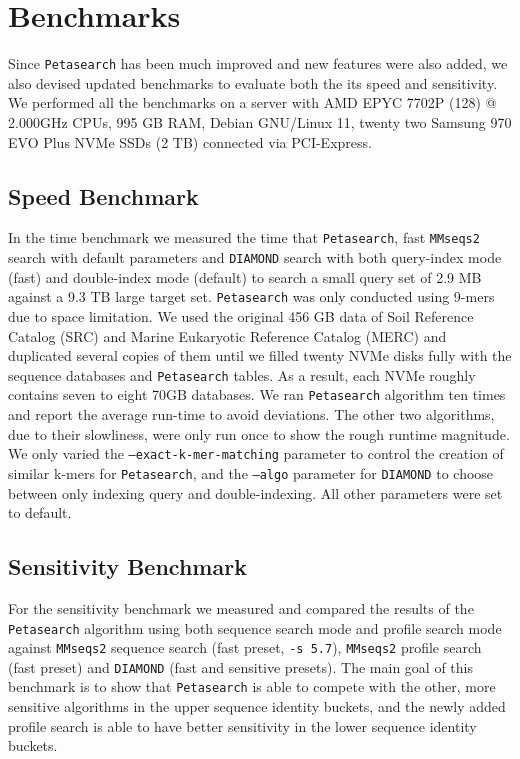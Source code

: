 \section{Benchmarks} \label{section:benchmarks}

Since \texttt{Petasearch} has been much improved and new features were also added, we also devised updated benchmarks to evaluate both the its speed and sensitivity.
We performed all the benchmarks on a server with AMD EPYC 7702P (128) @ 2.000GHz CPUs, 995 GB RAM, Debian GNU/Linux 11, twenty two Samsung 970 EVO Plus NVMe SSDs (2 TB) connected via PCI-Express.

\subsection{Speed Benchmark} \label{section:speed-benchmark}

In the time benchmark we measured the time that \texttt{Petasearch}, fast \texttt{MMseqs2} search with default parameters and \texttt{DIAMOND} search with both query-index mode (fast) and double-index mode (default) to search a small query set of 2.9 MB against a 9.3 TB large target set.
\texttt{Petasearch} was only conducted using 9-mers due to space limitation.
We used the original 456 GB data of Soil Reference Catalog (SRC) and Marine Eukaryotic Reference Catalog (MERC) \cite{steinegger_protein-level_2019} and duplicated several copies of them until we filled twenty NVMe disks fully with the sequence databases and \texttt{Petasearch} tables.
As a result, each NVMe roughly contains seven to eight 70GB databases.
We ran \texttt{Petasearch} algorithm ten times and
report the average run-time to avoid deviations.
The other two algorithms, due to their slowliness, were only run once to show the rough runtime magnitude.
We only varied the \texttt{--exact-k-mer-matching} parameter to control the creation of similar k-mers for \texttt{Petasearch}, and the \texttt{--algo} parameter for \texttt{DIAMOND} to choose between only indexing query and double-indexing.
All other parameters were set to default.

\subsection{Sensitivity Benchmark} \label{section:sensitivity-benchmark}

For the sensitivity benchmark we measured and compared the results of the \texttt{Petasearch} algorithm using both sequence search mode and profile search mode against \texttt{MMseqs2} sequence search (fast preset, \texttt{-s 5.7}), \texttt{MMseqs2} profile search (fast preset) and \texttt{DIAMOND} (fast and sensitive presets).
The main goal of this benchmark is to show that \texttt{Petasearch} is able to compete with the other, more sensitive algorithms in the upper sequence identity buckets, and the newly added profile search is able to have better sensitivity in the lower sequence identity buckets.

